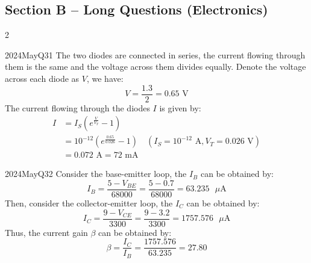 \subsection*{Section B -- Long Questions (Electronics)}
\begin{multicols}{2}

\begin{qsolution}{2024}{May}{Q31}{\tgElectronics \tgElectronicsDiodes}
    The two diodes are connected in series, the current flowing through them is the same and the voltage across them divides equally.
    Denote the voltage across each diode as $V$, we have:
    \[
        V=\frac{1.3}{2}=0.65\text{ V}
    \]
    The current flowing through the diodes $I$ is given by:
    \begin{align*}
        I &= I_S\left(e^{\frac{V}{V_T}}-1\right) \\
        &= 10^{-12}\left(e^{\frac{0.65}{0.026}}-1\right)\quad (I_S=10^{-12}\text{ A}, V_T=0.026\text{ V}) \\
        &= 0.072\text{ A} = \boxed{72\text{ mA}}
    \end{align*}
\end{qsolution}

\columnbreak

\begin{qsolution}{2024}{May}{Q32}{\tgElectronics \tgElectronicsBJT}
    Consider the base-emitter loop, the $I_{B}$ can be obtained by:
    \[
        I_B = \frac{5-V_{BE}}{68000} = \frac{5-0.7}{68000} = 63.235\text{ }\mu\text{A}
    \]
    Then, consider the collector-emitter loop, the $I_C$ can be obtained by:
    \[
        I_C = \frac{9-V_{CE}}{3300} = \frac{9-3.2}{3300} = 1757.576\text{ }\mu\text{A}
    \]
    Thus, the current gain $\beta$ can be obtained by:
    \[
        \beta = \frac{I_C}{I_B} = \frac{1757.576}{63.235} = \boxed{27.80}
    \]
\end{qsolution}

\end{multicols}

\pagebreak

